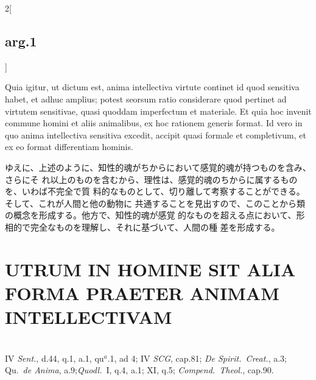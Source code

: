 \documentclass[paper=a4paper,fontsize=10pt,jafontsize=9pt,titlepage]{jlreq}
\begin{document}
\begin{paracol}{2}[\subsection{arg.1}]
 \switchcolumn

Quia igitur, ut dictum est, anima intellectiva virtute continet id quod
sensitiva habet, et adhuc amplius; potest seorsum ratio considerare quod
pertinet ad virtutem sensitivae, quasi quoddam imperfectum et materiale. Et quia
hoc invenit commune homini et aliis animalibus, ex hoc rationem generis
format. Id vero in quo anima intellectiva sensitiva excedit, accipit quasi
formale et completivum, et ex eo format differentiam hominis.


\switchcolumn

ゆえに、上述のように、知性的魂がちからにおいて感覚的魂が持つものを含み、さらにそ
れ以上のものを含むから、理性は、感覚的魂のちからに属するものを、いわば不完全で質
料的なものとして、切り離して考察することができる。そして、これが人間と他の動物に
共通することを見出すので、このことから類の概念を形成する。他方で、知性的魂が感覚
的なものを超える点において、形相的で完全なものを理解し、それに基づいて、人間の種
差を形成する。
 

\end{paracol}
\newpage
{}

\section{UTRUM IN HOMINE SIT ALIA FORMA PRAETER ANIMAM INTELLECTIVAM}
\vspace{1em}
\\
{\footnotesize IV {\itshape Sent.}, d.44, q.1, a.1, qu$^{a}$.1, ad 4; IV {\itshape SCG}, cap.81; {\itshape De Spirit.~Creat.}, a.3; Qu.~{\itshape de Anima}, a.9;{\itshape Quodl.}~I, q.4, a.1; XI, q.5; {\itshape Compend.~Theol.}, cap.90.}
\end{document}
